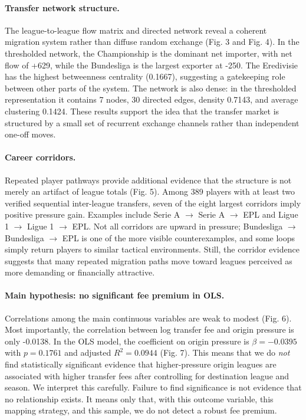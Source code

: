 \documentclass[12pt]{article}
\begin{document}
\paragraph*{Transfer network structure.} The league-to-league flow matrix and directed network reveal a coherent migration system rather than diffuse random exchange (Fig. 3 and Fig. 4). In the thresholded network, the Championship is the dominant net importer, with net flow of +629, while the Bundesliga is the largest exporter at -250. The Eredivisie has the highest betweenness centrality (0.1667), suggesting a gatekeeping role between other parts of the system. The network is also dense: in the thresholded representation it contains 7 nodes, 30 directed edges, density 0.7143, and average clustering 0.1424. These results support the idea that the transfer market is structured by a small set of recurrent exchange channels rather than independent one-off moves.

\paragraph*{Career corridors.} Repeated player pathways provide additional evidence that the structure is not merely an artifact of league totals (Fig. 5). Among 389 players with at least two verified sequential inter-league transfers, seven of the eight largest corridors imply positive pressure gain. Examples include Serie A $\rightarrow$ Serie A $\rightarrow$ EPL and Ligue 1 $\rightarrow$ Ligue 1 $\rightarrow$ EPL. Not all corridors are upward in pressure; Bundesliga $\rightarrow$ Bundesliga $\rightarrow$ EPL is one of the more visible counterexamples, and some loops simply return players to similar tactical environments. Still, the corridor evidence suggests that many repeated migration paths move toward leagues perceived as more demanding or financially attractive.

\paragraph*{Main hypothesis: no significant fee premium in OLS.} Correlations among the main continuous variables are weak to modest (Fig. 6). Most importantly, the correlation between log transfer fee and origin pressure is only -0.0138. In the OLS model, the coefficient on origin pressure is $\beta=-0.0395$ with $p=0.1761$ and adjusted $R^2=0.0944$ (Fig. 7). This means that we do \emph{not} find statistically significant evidence that higher-pressure origin leagues are associated with higher transfer fees after controlling for destination league and season. We interpret this carefully. Failure to find significance is not evidence that no relationship exists. It means only that, with this outcome variable, this mapping strategy, and this sample, we do not detect a robust fee premium.
\end{document}
